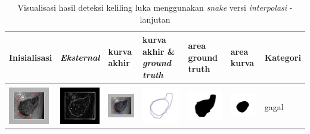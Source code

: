 \begin{table}[H]
	\centering
	\caption{Visualisasi hasil deteksi keliling luka menggunakan \emph{snake} versi \emph{interpolasi} - lanjutan}
	\label{tabel_hasil_13_interp}
	\begin{tabular}{|m{0.7in}|m{0.7in}|m{0.7in}|m{0.7in}|m{0.7in}|m{0.7in}|m{0.7in}|}
		\hline
		\textbf{Inisialisasi} & \textbf{\emph{Eksternal}} & \textbf{kurva akhir} & \textbf{kurva akhir \& \emph{ground truth}}& \textbf{area ground truth} & \textbf{area kurva} & \textbf{Kategori} \\
		\hline
		
		&  &  & & & &  \\
		\includegraphics[width=0.7in]{dataset/dataset_3/luka_merah/ready/26_interp_init.jpg}&
		\includegraphics[width=0.7in]{dataset/dataset_3/luka_merah/ready/26_interp_ext.jpg}&
		\includegraphics[width=0.7in]{dataset/dataset_3/luka_merah/ready/26_interp_result.jpg}&
		\includegraphics[width=0.7in]{dataset/dataset_3/luka_merah/ready/26_gt_r.jpg}&
		\includegraphics[width=0.7in]{dataset/dataset_3/luka_merah/ready/26_r.jpg}&
		\includegraphics[width=0.7in]{dataset/dataset_3/luka_merah/ready/26_interp_r.jpg}&
		gagal\\
		\hline
		

\end{tabular}
\end{table}
